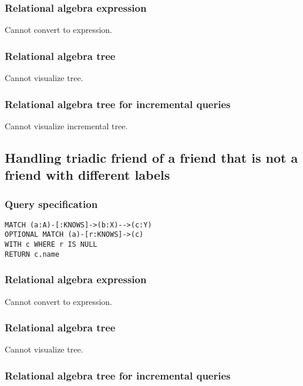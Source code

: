 \subsubsection*{Relational algebra expression}

Cannot convert to expression.

\subsubsection*{Relational algebra tree}

Cannot visualize tree.

\subsubsection*{Relational algebra tree for incremental queries}

Cannot visualize incremental tree.

\subsection{Handling triadic friend of a friend that is not a friend with different labels}

\subsubsection*{Query specification}

\begin{lstlisting}
MATCH (a:A)-[:KNOWS]->(b:X)-->(c:Y)
OPTIONAL MATCH (a)-[r:KNOWS]->(c)
WITH c WHERE r IS NULL
RETURN c.name
\end{lstlisting}

\subsubsection*{Relational algebra expression}

Cannot convert to expression.

\subsubsection*{Relational algebra tree}

Cannot visualize tree.

\subsubsection*{Relational algebra tree for incremental queries}

